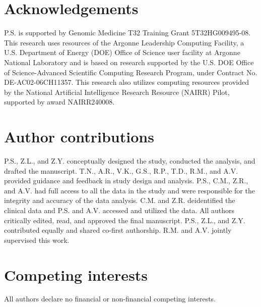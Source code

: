 \documentclass[fleqn,10pt]{wlscirep}
\begin{document}

\section*{Acknowledgements}

P.S. is supported by Genomic Medicine T32 Training Grant 5T32HG009495-08. This research uses resources of the Argonne Leadership Computing Facility, a U.S. Department of Energy (DOE) Office of Science user facility at Argonne National Laboratory and is based on research supported by the U.S. DOE Office of Science-Advanced Scientific Computing Research Program, under Contract No. DE-AC02-06CH11357. This research also utilizes computing resources provided by the National Artificial Intelligence Research Resource (NAIRR) Pilot, supported by award NAIRR240008.

\section*{Author contributions}

P.S., Z.L., and Z.Y. conceptually designed the study, conducted the analysis, and drafted the manuscript. T.N., A.R., V.K., G.S., R.P., T.D., R.M., and A.V. provided guidance and feedback in study design and analysis. P.S., C.M., Z.R., and A.V. had full access to all the data in the study and were responsible for the integrity and accuracy of the data analysis. C.M. and Z.R. deidentified the clinical data and P.S. and A.V. accessed and utilized the data. All authors critically edited, read, and approved the final manuscript. P.S., Z.L., and Z.Y. contributed equally and shared co-first authorship. R.M. and A.V. jointly supervised this work. 

\section*{Competing interests}
All authors declare no financial or non-financial competing interests. 


\end{document}
